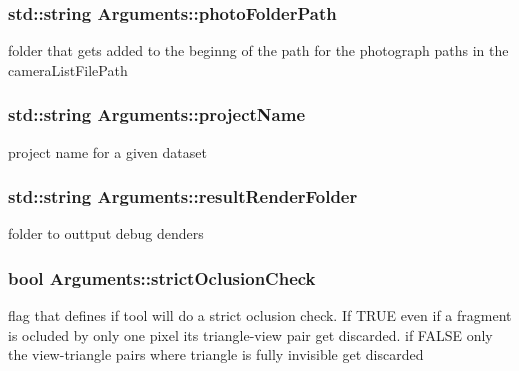 \subsubsection[{photo\+Folder\+Path}]{\setlength{\rightskip}{0pt plus 5cm}std\+::string Arguments\+::photo\+Folder\+Path}\label{struct_arguments_a784aabe9dd9bbeb828d1ad845b72887c}
folder that gets added to the beginng of the path for the photograph paths in the camera\+List\+File\+Path \hypertarget{struct_arguments_a5ce8b0bed244a327b762f2bb1630708b}{}
\subsubsection[{project\+Name}]{\setlength{\rightskip}{0pt plus 5cm}std\+::string Arguments\+::project\+Name}\label{struct_arguments_a5ce8b0bed244a327b762f2bb1630708b}
project name for a given dataset \hypertarget{struct_arguments_adadef95480756dd3922728cd40b8d334}{}
\subsubsection[{result\+Render\+Folder}]{\setlength{\rightskip}{0pt plus 5cm}std\+::string Arguments\+::result\+Render\+Folder}\label{struct_arguments_adadef95480756dd3922728cd40b8d334}
folder to outtput debug denders \hypertarget{struct_arguments_ab0a6f926571b9ebd895f84af4214880b}{}
\subsubsection[{strict\+Oclusion\+Check}]{\setlength{\rightskip}{0pt plus 5cm}bool Arguments\+::strict\+Oclusion\+Check}\label{struct_arguments_ab0a6f926571b9ebd895f84af4214880b}
flag that defines if tool will do a strict oclusion check. If T\+R\+U\+E even if a fragment is ocluded by only one pixel its triangle-\/view pair get discarded. if F\+A\+L\+S\+E only the view-\/triangle pairs where triangle is fully invisible get discarded \hypertarget{struct_arguments_acba64f044d4603abac85ba2cf1b50b75}{}
